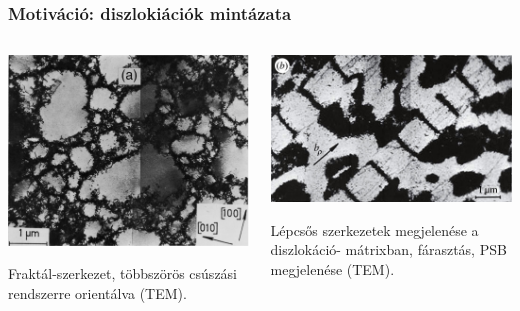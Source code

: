 \documentclass[12pt]{beamer}
\begin{document}
\begin{frame}
\frametitle{Motiváció: diszlokiációk mintázata}

\begin{columns}
\begin{column}{0.5\textwidth}
  \begin{center}
  \includegraphics[scale=0.44]{figs/disloc_fractal.jpg}
  \end{center}
  Fraktál-szerkezet, többszörös csúszási rendszerre orientálva (TEM).
\end{column}
\begin{column}{0.5\textwidth}  %
  \begin{center}
  \includegraphics[scale=0.6]{figs/disloc_psb_m.jpg}
  \end{center}
  Lépcsős szerkezetek megjelenése a diszlokáció- mátrixban, fárasztás, PSB megjelenése (TEM).
\end{column}
\end{columns}

\end{frame}
\end{document}
